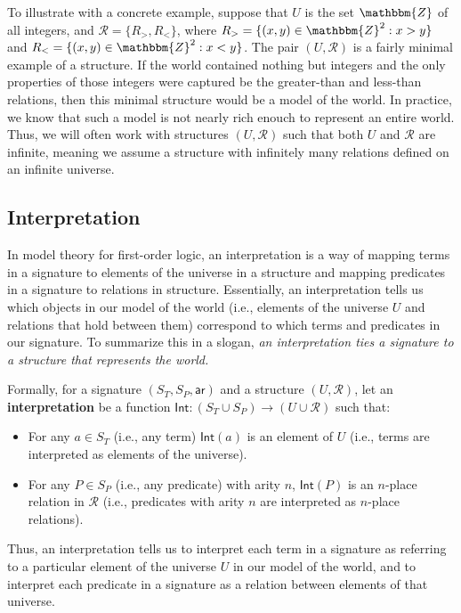 \documentclass[11pt]{article}
\theoremstyle{definition}
\theoremstyle{remark}
\begin{document}
To illustrate with a concrete example, suppose that $U$ is the set $\mathbbm{Z}$ of all integers, and $\mathcal{R}=\{R_{>},R_{<}\}$, where $R_{>}=\{(x,y)\in\mathbbm{Z}^{2}:x>y\}$ and $R_{<}=\{(x,y)\in\mathbbm{Z}^{2}:x<y\}$. The pair $(U,\mathcal{R})$ is a fairly minimal example of a structure. If the world contained nothing but integers and the only properties of those integers were captured be the greater-than and less-than relations, then this minimal structure would be a model of the world. In practice, we know that such a model is not nearly rich enouch to represent an entire world. Thus, we will often work with structures $(U,\mathcal{R})$ such that both $U$ and $\mathcal{R}$ are infinite, meaning we assume a structure with infinitely many relations defined on an infinite universe.\par 



\subsection{Interpretation}
In model theory for first-order logic, an interpretation is a way of mapping terms in a signature to elements of the universe in a structure and mapping predicates in a signature to relations in structure. Essentially, an interpretation tells us which objects in our model of the world (i.e., elements of the universe $U$ and relations that hold between them) correspond to which terms and predicates in our signature. To summarize this in a slogan, \textit{an interpretation ties a signature to a structure that represents the world.}

Formally, for a signature $(S_{T},S_{P},\textsf{ar})$ and a structure $(U,\mathcal{R})$, let an \textbf{interpretation} be a function $\textsf{Int}:(S_{T}\cup S_{P})\rightarrow(U\cup \mathcal{R})$ such that:
\begin{itemize}
    \item For any $a\in S_{T}$ (i.e., any term) $\textsf{Int}(a)$ is an element of $U$ (i.e., terms are interpreted as elements of the universe).

    \item For any $P\in S_{P}$ (i.e., any predicate) with arity $n$, $\textsf{Int}(P)$ is an $n$-place relation in $\mathcal{R}$ (i.e., predicates with arity $n$ are interpreted as $n$-place relations).
\end{itemize}
Thus, an interpretation tells us to interpret each term in a signature as referring to a particular element of the universe $U$ in our model of the world, and to interpret each predicate in a signature as a relation between elements of that universe.\par 
\end{document}
